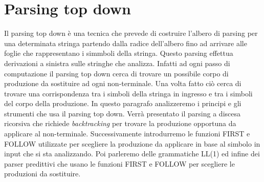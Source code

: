 \section{Parsing top down}
Il parsing top down è una tecnica che prevede di costruire l'albero di parsing per una determinata stringa partendo dalla radice dell'albero fino ad arrivare alle foglie che rappresentano i simmboli della stringa. Questo parsing effettua derivazioni a sinistra sulle stringhe che analizza. Infatti ad ogni passo di computazione il parsing top down cerca di trovare un possibile corpo di produzione da sostituire ad ogni non-terminale. Una volta fatto ciò cerca di trovare una corrispondenza tra i simboli della stringa in ingresso e tra i simboli del corpo della produzione. In questo paragrafo analizzeremo i principi e gli strumenti che usa il parsing top down. Verrà presentato il parsing a discesa ricorsiva che richiede \textit{backtracking} per trovare la produzione opportuna da applicare al non-terminale. Successivamente introdurremo le funzioni FIRST e FOLLOW utilizzate per scegliere la produzione da applicare in base al simbolo in input che si sta analizzando. Poi parleremo delle grammatiche LL(1) ed infine dei parser predittivi che usano le funzioni FIRST e FOLLOW per scegliere le produzioni da sostituire.
